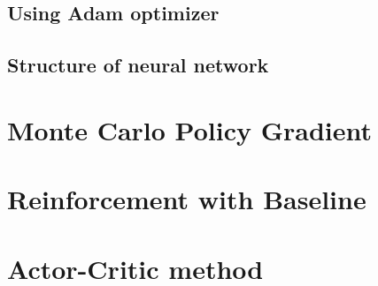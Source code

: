 \documentclass[a4paper,12pt]{article}  %
\theoremstyle{definition}
\begin{document}
	\subsection{Using Adam optimizer}
	
	
	\subsection{Structure of neural network}
	
	\section{Monte Carlo Policy Gradient}
	
	\section{Reinforcement with Baseline}
	
	\section{Actor-Critic method}
		
	

	
	\small
	
	 
	
\end{document}
